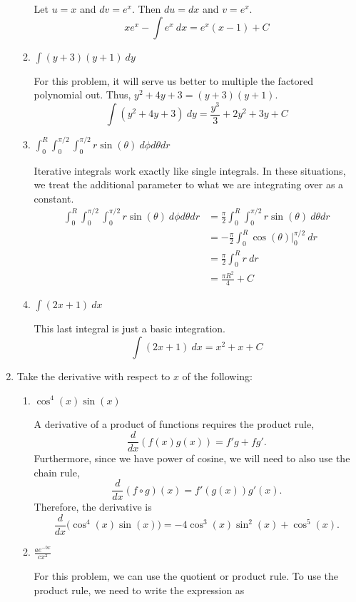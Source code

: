 \begin{enumerate}
\begin{enumerate}[label = (\alph*), ref = \theenumi{(\alph*)}]
    Let \(u = x\) and \(dv = e^x\).
    Then \(du = dx\) and \(v = e^x\).
    \[
    xe^x - \int e^x \ dx = e^x(x - 1) + C
    \]
  \item
    \(\int(y + 3)(y + 1) \ dy\)
    \par\smallskip
    For this problem, it will serve us better to multiple the factored
    polynomial out.
    Thus, \(y^2 + 4y + 3 = (y + 3)(y + 1)\).
    \[
    \int(y^2 + 4y + 3) \ dy = \frac{y^3}{3} + 2y^2 + 3y + C
    \]
  \item
    \(\int_0^R\int_0^{\pi/2}\int_0^{\pi/2}r\sin(\theta) \ d\phi d\theta dr\)
    \par\smallskip
    Iterative integrals work exactly like single integrals.
    In these situations, we treat the additional parameter to what we are
    integrating over as a constant.
    \begin{align*}
      \int_0^R\int_0^{\pi/2}\int_0^{\pi/2}r\sin(\theta) \ d\phi d\theta dr
      &= \frac{\pi}{2}\int_0^R\int_0^{\pi/2}r\sin(\theta) \ d\theta dr\\
      &= -\frac{\pi}{2}\int_0^R\cos(\theta)\big|_0^{\pi/2} \ dr\\
      &= \frac{\pi}{2}\int_0^Rr \ dr\\
      &= \frac{\pi R^2}{4} + C
    \end{align*}
  \item
    \(\int(2x + 1) \ dx\)
    \par\smallskip
    This last integral is just a basic integration.
    \[
    \int(2x + 1) \ dx = x^2 + x + C
    \]
  \end{enumerate}
\item
  Take the derivative with respect to \(x\) of the following:
  \begin{enumerate}[label = (\alph*)]
  \item
    \(\cos^4(x)\sin(x)\)
    \par\smallskip
    A derivative of a product of functions requires the product rule,
    \[
    \frac{d}{dx}(f(x)g(x)) = f'g + fg'.
    \]
    Furthermore, since we have power of cosine, we will need to also use the
    chain rule,
    \[
    \frac{d}{dx}(f\circ g)(x) = f'(g(x))g'(x).
    \]
    Therefore, the derivative is
    \[
    \frac{d}{dx}\big(\cos^4(x)\sin(x)\big) =
    -4\cos^3(x)\sin^2(x) + \cos^5(x).
    \]
  \item
    \(\frac{ae^{-bx}}{cx^2}\)
    \par\smallskip
    For this problem, we can use the quotient or product rule.
    To use the product rule, we need to write the expression as

\end{enumerate}
\end{enumerate}
